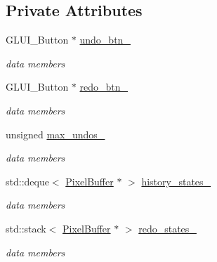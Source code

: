 \subsection*{Private Attributes}
\begin{DoxyCompactItemize}
\item 
G\+L\+U\+I\+\_\+\+Button $\ast$ \hyperlink{classimage__tools_1_1StateManager_adbe2820d914eb5ba08de3dfcc61aa82d}{undo\+\_\+btn\+\_\+}\hypertarget{classimage__tools_1_1StateManager_adbe2820d914eb5ba08de3dfcc61aa82d}{}\label{classimage__tools_1_1StateManager_adbe2820d914eb5ba08de3dfcc61aa82d}

\begin{DoxyCompactList}\small\item\em data members \end{DoxyCompactList}\item 
G\+L\+U\+I\+\_\+\+Button $\ast$ \hyperlink{classimage__tools_1_1StateManager_a6fd0aef5e8fc7b52cf6f9de416ac4825}{redo\+\_\+btn\+\_\+}\hypertarget{classimage__tools_1_1StateManager_a6fd0aef5e8fc7b52cf6f9de416ac4825}{}\label{classimage__tools_1_1StateManager_a6fd0aef5e8fc7b52cf6f9de416ac4825}

\begin{DoxyCompactList}\small\item\em data members \end{DoxyCompactList}\item 
unsigned \hyperlink{classimage__tools_1_1StateManager_a01880162d6098bca3fa61e551365c214}{max\+\_\+undos\+\_\+}\hypertarget{classimage__tools_1_1StateManager_a01880162d6098bca3fa61e551365c214}{}\label{classimage__tools_1_1StateManager_a01880162d6098bca3fa61e551365c214}

\begin{DoxyCompactList}\small\item\em data members \end{DoxyCompactList}\item 
std\+::deque$<$ \hyperlink{classimage__tools_1_1PixelBuffer}{Pixel\+Buffer} $\ast$ $>$ \hyperlink{classimage__tools_1_1StateManager_afbf08670a705b087ae0e0235404151dd}{history\+\_\+states\+\_\+}\hypertarget{classimage__tools_1_1StateManager_afbf08670a705b087ae0e0235404151dd}{}\label{classimage__tools_1_1StateManager_afbf08670a705b087ae0e0235404151dd}

\begin{DoxyCompactList}\small\item\em data members \end{DoxyCompactList}\item 
std\+::stack$<$ \hyperlink{classimage__tools_1_1PixelBuffer}{Pixel\+Buffer} $\ast$ $>$ \hyperlink{classimage__tools_1_1StateManager_a451e9938df3ecde4fad4e45892a8634a}{redo\+\_\+states\+\_\+}\hypertarget{classimage__tools_1_1StateManager_a451e9938df3ecde4fad4e45892a8634a}{}\label{classimage__tools_1_1StateManager_a451e9938df3ecde4fad4e45892a8634a}

\begin{DoxyCompactList}\small\item\em data members \end{DoxyCompactList}\end{DoxyCompactItemize}


